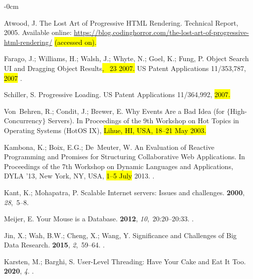 \documentclass[software,article,accept,pdftex,moreauthors]{Definitions/mdpi}
\begin{document}
\begin{adjustwidth}{-\extralength}{0cm}
\begin{thebibliography}{999}
Atwood, J.
\newblock The Lost Art of Progressive HTML Rendering.
\newblock Technical Report, 2005.
  Available online: \url{https://blog.codinghorror.com/the-lost-art-of-progressive-html-rendering/} \hl{(accessed on).}

Farago, J.; Williams, H.; Walsh, J.; Whyte, N.; Goel, K.; Fung, P.
\newblock Object Search UI and Dragging Object Results\hl{,  ~23 2007.} %
\newblock US Patent Applications 11/353,787, \hl{2007}%
.

Schiller, S.
\newblock Progressive Loading.
\newblock US Patent Applications 11/364,992, \hl{2007.} %


Von~Behren, R.; Condit, J.; Brewer, E.
\newblock Why Events Are a Bad Idea (for $\{$High-Concurrency$\}$ Servers).
\newblock In Proceedings of the 9th Workshop on Hot Topics in Operating Systems
  (HotOS IX), \hl{Lihue, HI, USA, 18–21 May 2003.}

Kambona, K.; Boix, E.G.; De~Meuter, W.
\newblock An Evaluation of Reactive Programming and Promises for Structuring
  Collaborative Web Applications.
\newblock In Proceedings of the 7th Workshop on Dynamic
  Languages and Applications, DYLA '13, New York, NY, USA, \hl{1–5 July} 2013.
.

Kant, K.; Mohapatra, P.
\newblock Scalable Internet servers: Issues and challenges.
 {\bf 2000}, {\em
  28},~5--8.

Meijer, E.
\newblock Your Mouse is a Database.
 {\bf 2012}, {\em 10},~20:20--20:33.
.

Jin, X.; Wah, B.W.; Cheng, X.; Wang, Y.
\newblock Significance and Challenges of Big Data Research.
 {\bf 2015}, {\em 2},~59--64.
.

Karsten, M.; Barghi, S.
\newblock User-Level Threading: Have Your Cake and Eat It Too.
 {\bf 2020}, {\em 4}.
.


\end{thebibliography}
\end{adjustwidth}
\end{document}

